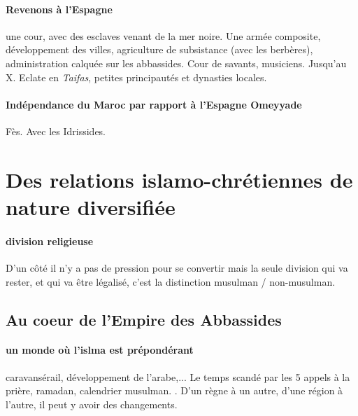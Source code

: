 \paragraph{Revenons à l'Espagne} une cour, avec des esclaves venant de la mer noire. Une armée composite, développement des villes, agriculture de subsistance (avec les berbères), administration calquée sur les abbassides. Cour de savants, musiciens. Jusqu'au X. Eclate en \textit{Taifas}, petites principautés et dynasties locales. 

\paragraph{Indépendance du Maroc par rapport à l'Espagne Omeyyade} Fès. Avec les Idrissides. 






\section{Des relations islamo-chrétiennes de nature diversifiée}

\paragraph{division religieuse} D'un côté il n'y a pas de pression pour se convertir mais la seule division qui va rester, et qui va être légalisé, c'est la distinction musulman / non-musulman. 


\subsection{Au coeur de l'Empire des Abbassides}

\paragraph{un monde où l'islma est prépondérant} caravansérail, développement de l'arabe,... Le temps scandé par les 5 appels à la prière, ramadan, calendrier musulman.  . D'un règne à un autre, d'une région à l'autre, il peut y avoir des changements.

